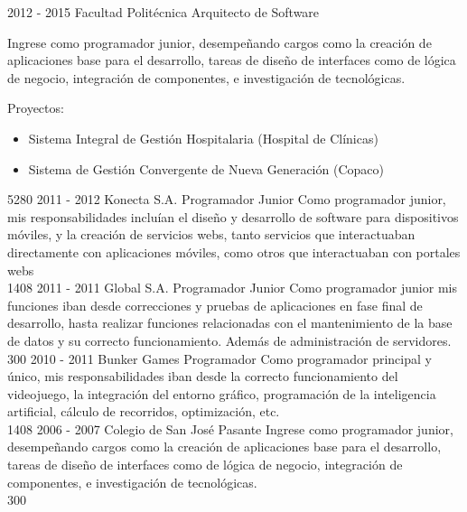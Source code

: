 \documentclass[]{friggeri-cv}
\begin{document}
\begin{entrylist}
{	}
    {}


\entry
    {2012 - 2015}
    {Facultad Politécnica}
    {Arquitecto de Software}
    {Ingrese como programador junior, desempeñando cargos como la creación de
        aplicaciones base para el desarrollo, tareas de diseño de interfaces
        como de lógica de negocio, integración de componentes, e investigación
        de tecnológicas.

        Proyectos:
        \begin{itemize}
            \item Sistema Integral de Gestión Hospitalaria (Hospital de
                Clínicas)
            \item Sistema de Gestión Convergente de Nueva Generación (Copaco)
        \end{itemize}}
    {5280}
\entry
    {2011 - 2012}
    {Konecta S.A.}
    {Programador Junior}
    {Como programador junior, mis responsabilidades incluían el diseño y
        desarrollo de software para dispositivos móviles, y la creación de
        servicios webs, tanto servicios que interactuaban directamente con
        aplicaciones móviles, como otros que interactuaban con portales webs
        \\}
    {1408}
\entry
    {2011 - 2011}
    {Global S.A.}
    {Programador Junior}
    {Como programador junior mis funciones iban desde correcciones y pruebas de
        aplicaciones en fase final de desarrollo, hasta realizar funciones
        relacionadas con el mantenimiento de la base de datos y su correcto
        funcionamiento. Además de administración de servidores. \\}
    {300}
\entry
    {2010 - 2011}
    {Bunker Games}
    {Programador}
    {Como programador principal y único, mis responsabilidades iban desde la
        correcto funcionamiento del videojuego, la integración del entorno
        gráfico, programación de la inteligencia artificial, cálculo de
        recorridos, optimización, etc. \\}
    {1408}
\entry
    {2006 - 2007}
    {Colegio de San José}
    {Pasante}
    {Ingrese como programador junior, desempeñando cargos como la
creación de aplicaciones base para el desarrollo, tareas de diseño de
interfaces como de lógica de negocio, integración de componentes, e
investigación de tecnológicas. \\}
    {300}

\end{entrylist}
\end{document}
